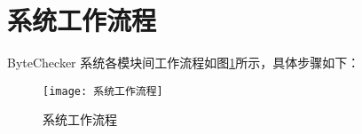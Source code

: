 \documentclass[print, master, vlined, timesmath]{DissertUESTC}
\begin{document}








\section{系统工作流程}
ByteChecker 系统各模块间工作流程如图\ref{fig:系统工作流程}所示，具体步骤如下：

\begin{figure}
    \hspace*{4.5cm}
    \texttt{[image: 系统工作流程]}
    \caption{系统工作流程}
    \label{fig:系统工作流程}
\end{figure}
\end{document}
